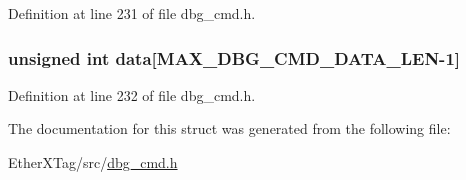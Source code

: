 Definition at line 231 of file dbg\-\_\-cmd.\-h.

\hypertarget{structdbg__cmd__type__connect__xscope__channel_abceed6826af53b88f4cc936fac1716f0}{
\subsubsection[{data}]{\setlength{\rightskip}{0pt plus 5cm}unsigned int data\mbox{[}{\bf M\-A\-X\-\_\-\-D\-B\-G\-\_\-\-C\-M\-D\-\_\-\-D\-A\-T\-A\-\_\-\-L\-E\-N}-\/1\mbox{]}}}\label{structdbg__cmd__type__connect__xscope__channel_abceed6826af53b88f4cc936fac1716f0}


Definition at line 232 of file dbg\-\_\-cmd.\-h.



The documentation for this struct was generated from the following file\-:\begin{DoxyCompactItemize}
\item 
Ether\-X\-Tag/src/\hyperlink{dbg__cmd_8h}{dbg\-\_\-cmd.\-h}\end{DoxyCompactItemize}

